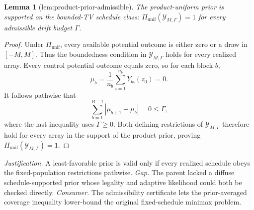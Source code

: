 \documentclass{article}
\newtheorem{lemma}{Lemma}
\begin{document}
\begin{lemma}[lem:product-prior-admissible]\label{lem:product-prior-admissible}
The product-uniform prior is supported on the bounded-TV schedule class: \(\Pi_{\mathrm{unif}}(\mathcal Y_{M,\Gamma})=1\) for every admissible drift budget \(\Gamma\).
\end{lemma}
\begin{proof}
Under \(\Pi_{\mathrm{unif}}\), every available potential outcome is either zero or a draw in \([-M,M]\).  Thus the boundedness condition in \(\mathcal Y_{M,\Gamma}\) holds for every realized array.  Every control potential outcome equals zero, so for each block \(b\),
\[
 \mu_b=\frac1{n_b}\sum_{i=1}^{n_b}Y_{bi}(z_0)=0.
\]
It follows pathwise that
\[
 \sum_{b=1}^{B-1}|\mu_{b+1}-\mu_b|=0\le\Gamma,
\]
where the last inequality uses \(\Gamma\ge0\).  Both defining restrictions of \(\mathcal Y_{M,\Gamma}\) therefore hold for every array in the support of the product prior, proving \(\Pi_{\mathrm{unif}}(\mathcal Y_{M,\Gamma})=1\).
\end{proof}
\par\smallskip\noindent \textit{Justification.} A least-favorable prior is valid only if every realized schedule obeys the fixed-population restrictions pathwise. \textit{Gap.} The parent lacked a diffuse schedule-supported prior whose legality and adaptive likelihood could both be checked directly. \textit{Consumer.} The admissibility certificate lets the prior-averaged coverage inequality lower-bound the original fixed-schedule minimax problem.
\end{document}
